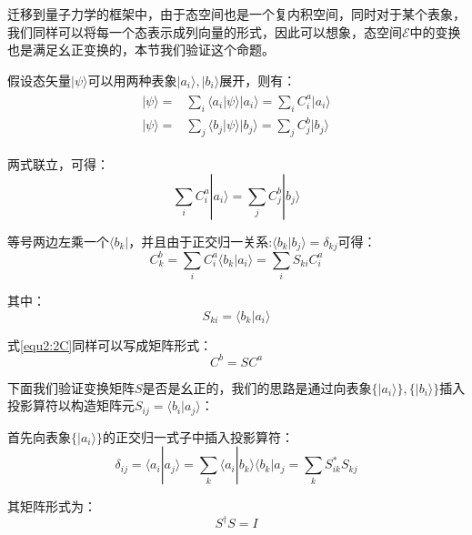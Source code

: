     迁移到量子力学的框架中，由于态空间也是一个复内积空间，同时对于某个表象，我们同样可以将每一个态表示成列向量的形式，因此可以想象，态空间$\mathscr{E}$中的变换也是满足幺正变换的，本节我们验证这个命题。
    
    假设态矢量$|\psi\rangle$可以用两种表象$|a_i\rangle,|b_i\rangle$展开，则有：
    \begin{align}
        \begin{split}
            |\psi\rangle=&\sum_i\langle a_i|\psi\rangle|a_i\rangle=\sum_i C_i^a|a_i\rangle\\
            |\psi\rangle=&\sum_j\langle b_j|\psi\rangle|b_j\rangle=\sum_j C_j^b|b_j\rangle
        \end{split}
    \end{align}
    
    两式联立，可得：
    \begin{equation}
        \sum_i C_i^a|a_i\rangle=\sum_j C_j^b|b_j\rangle
    \end{equation}
    
    等号两边左乘一个$\langle b_k|$，并且由于正交归一关系:$\langle b_k|b_j\rangle=\delta_{kj}$可得：
    \begin{equation}\label{equ2:2C}
        C_k^b=\sum_i C_i^a\langle b_k|a_i\rangle=\sum_i S_{ki}C_i^a
    \end{equation}
    
    其中：
    \begin{equation}
        S_{ki}=\langle b_k|a_i\rangle
    \end{equation}
    
    式\ref{equ2:2C}同样可以写成矩阵形式：
    \begin{equation}
        C^b=S C^a
    \end{equation}
    
    下面我们验证变换矩阵$S$是否是幺正的，我们的思路是通过向表象$\{|a_i\rangle\},\{|b_i\rangle\}$插入投影算符以构造矩阵元$S_{ij}=\langle b_i|a_j\rangle$：
    
    首先向表象$\{|a_i\rangle\}$的正交归一式子中插入投影算符：
    \begin{equation}
         \delta_{ij}=\langle a_i|a_j\rangle=\sum_k \langle a_i|b_k\rangle\langle b_k|a_j=\sum_k S_{ik}^*S_{kj}
    \end{equation}
 
    其矩阵形式为：
    \begin{equation}
        S^\dagger S=I
    \end{equation}
    
